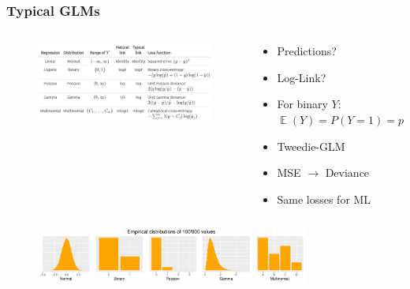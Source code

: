 \documentclass[
    utf8,
    aspectratio=169
]{beamer}  %
\DeclareMathOperator{\E}{\mathbb{E}}  %
\begin{document}
\begin{frame}
	\frametitle{Typical GLMs}
	\begin{columns}[onlytextwidth]
		\begin{footnotesize}
			\begin{figure}
				\includegraphics[width=1\textwidth]{pics/glm.png}
			\end{figure}
		\end{footnotesize}
		\begin{footnotesize}
			\begin{itemize}
				\itemsep0em 
				\item Predictions?
				\item Log-Link?
				\item For binary $Y$:
				$\E(Y) = P(Y = 1) = p$
				\item Tweedie-GLM
				\item MSE $\rightarrow$ Deviance
				\item Same losses for ML
			\end{itemize}
		\end{footnotesize}
	\end{columns}

	\begin{figure}
		\includegraphics[width=0.8\textwidth]{pics/GLM_distributions.pdf}
	\end{figure}
\end{frame}
\end{document}
